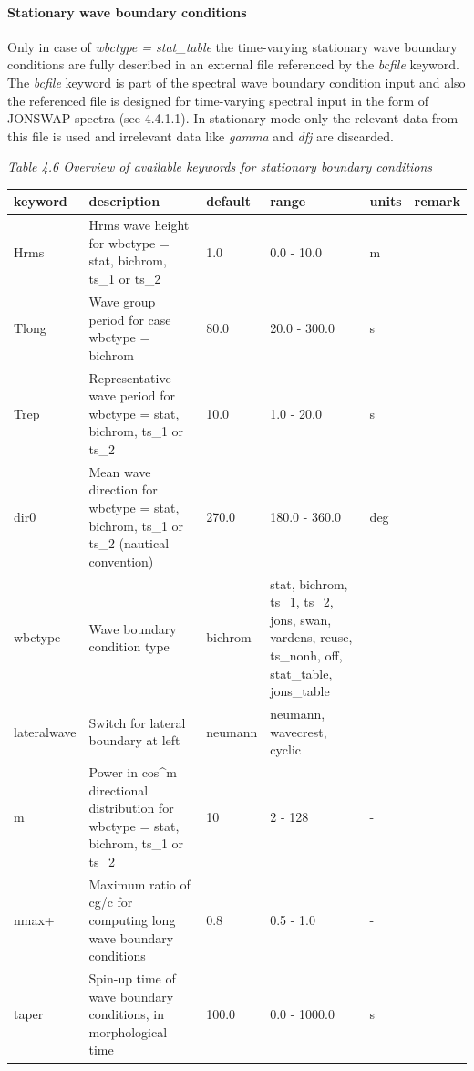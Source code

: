 \documentclass{article}
\begin{document}
\paragraph{ Stationary wave boundary conditions}

\noindent Only in case of \textit{wbctype = stat\_table} the time-varying stationary wave boundary conditions are fully described in an external file referenced by the \textit{bcfile} keyword. The \textit{bcfile }keyword is part of the spectral wave boundary condition input and also the referenced file is designed for time-varying spectral input in the form of JONSWAP spectra (see 4.4.1.1). In stationary mode only the relevant data from this file is used and irrelevant data like \textit{gamma} and \textit{dfj} are discarded. 

\noindent \textit{Table 4.6 Overview of available keywords for stationary boundary conditions}

\begin{tabular}{|p{0.8in}|p{1.1in}|p{0.6in}|p{0.8in}|p{0.4in}|p{0.6in}|} \hline 
keyword & description & default & range & units & remark \\ \hline 
Hrms & Hrms wave height for wbctype = stat, bichrom, ts\_1 or ts\_2 & 1.0 & 0.0 - 10.0 & m &  \\ \hline 
Tlong & Wave group period for case wbctype = bichrom & 80.0 & 20.0 - 300.0 & s &  \\ \hline 
Trep & Representative wave period for wbctype = stat, bichrom, ts\_1 or ts\_2 & 10.0 & 1.0 - 20.0 & s &  \\ \hline 
dir0 & Mean wave direction for wbctype = stat, bichrom, ts\_1 or ts\_2 (nautical convention) & 270.0 & 180.0 - 360.0 & deg &  \\ \hline 
wbctype & Wave boundary condition type & bichrom & stat, bichrom, ts\_1, ts\_2, jons, swan, vardens, reuse, ts\_nonh, off, stat\_table, jons\_table &  &  \\ \hline 
lateralwave & Switch for lateral boundary at left & neumann & neumann, wavecrest, cyclic &  &  \\ \hline 
m & Power in cos\^{}m directional distribution for wbctype = stat, bichrom, ts\_1 or ts\_2 & 10 & 2 - 128 & - &  \\ \hline 
nmax+ & Maximum ratio of cg/c for computing long wave boundary conditions & 0.8 & 0.5 - 1.0 & - &  \\ \hline 
taper & Spin-up time of wave boundary conditions, in morphological time & 100.0 & 0.0 - 1000.0 & s &  \\ \hline 
\end{tabular}
\end{document}
